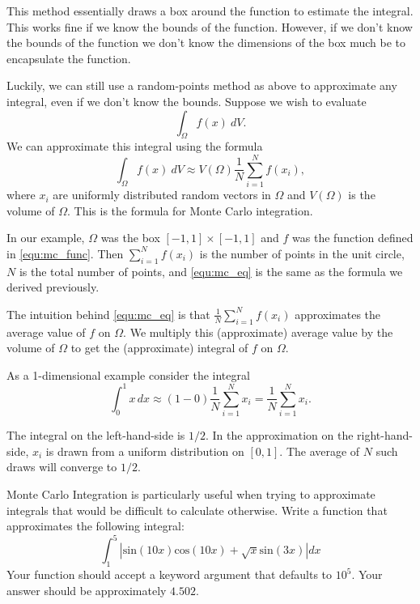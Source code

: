 This method essentially draws a box around the function to estimate the integral. This works fine if we know the bounds of the function. However, if we don't know the bounds of the function we don't know the dimensions of the box much be to encapsulate the function. 

Luckily, we can still use a random-points method as above to approximate any integral, even if we don't know the bounds. Suppose we wish to evaluate
\[
\int_\Omega f(x)\:dV.
\]
We can approximate this integral using the formula
\begin{equation}\label{equ:mc_eq}
\int_\Omega f(x)\:dV \approx V(\Omega) \frac{1}{N} \sum_{i=1}^N f(x_i),
\end{equation}
where $x_i$ are uniformly distributed random vectors in $\Omega$ and $V(\Omega)$ is the volume of $\Omega$.
This is the formula for Monte Carlo integration. 


In our example, $\Omega$ was the box $[-1,1] \times [-1,1]$ and $f$ was the function defined in \eqref{equ:mc_func}.
Then $\sum_{i=1}^N f(x_i)$ is the number of points in the unit circle, $N$ is the total number of points, and \eqref{equ:mc_eq} is the same as the formula we derived previously.

The intuition behind \eqref{equ:mc_eq} is that $\frac{1}{N} \sum_{i=1}^N f(x_i)$ approximates the average value of $f$ on $\Omega$.
We multiply this (approximate) average value by the volume of $\Omega$ to get the (approximate) integral of $f$ on $\Omega$.

As a 1-dimensional example consider the integral 
\[
\int_0^1 x\,dx \approx (1-0)\frac{1}{N} \sum_{i=1}^N x_i=\frac{1}{N} \sum_{i=1}^N x_i.
\]

The integral on the left-hand-side is $1/2$. 
In the approximation on the right-hand-side, $x_i$ is drawn from a uniform distribution on $[0,1]$. 
The average of $N$ such draws will converge to $1/2$. 

\begin{problem}
\label{prob:crazy_sine}
Monte Carlo Integration is particularly useful when trying to approximate integrals that would be difficult to calculate otherwise. Write a function that approximates the following integral:
$$\int_{1}^{5} \left | \text{sin}(10x)\text{cos}(10x) + \sqrt{x}\text{sin}(3x) \right | dx$$
Your function should accept a keyword argument  that defaults to $10^5$. Your answer should be approximately $4.502$.
\end{problem}

